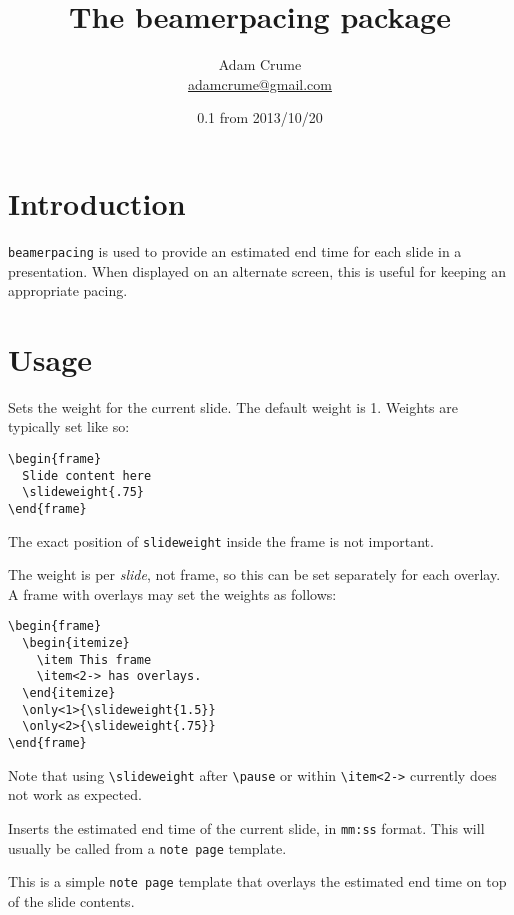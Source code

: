 \documentclass{ltxdoc}
\begin{document}

\title{The \textsf{beamerpacing} package}
\author{Adam Crume \\ \url{adamcrume@gmail.com}}
\date{0.1 from 2013/10/20}

\maketitle

\section{Introduction}

\texttt{beamerpacing} is used to provide an estimated end time for each slide in a presentation.
When displayed on an alternate screen, this is useful for keeping an appropriate pacing.

\section{Usage}

\DescribeMacro{\slideweight}
Sets the weight for the current slide.
The default weight is 1.
Weights are typically set like so:
\begin{verbatim}\begin{frame}
  Slide content here
  \slideweight{.75}
\end{frame}\end{verbatim}
The exact position of \verb|slideweight| inside the frame is not important.

The weight is per \emph{slide}, not frame, so this can be set separately for each overlay.
A frame with overlays may set the weights as follows:
\begin{verbatim}\begin{frame}
  \begin{itemize}
    \item This frame
    \item<2-> has overlays.
  \end{itemize}
  \only<1>{\slideweight{1.5}}
  \only<2>{\slideweight{.75}}
\end{frame}\end{verbatim}
Note that using \verb|\slideweight| after \verb|\pause| or within \verb|\item<2->| currently does not work as expected.

\DescribeMacro{\slidefinishtime}
Inserts the estimated end time of the current slide, in \texttt{mm:ss} format.
This will usually be called from a \texttt{note page} template.

This is a simple \texttt{note page} template that overlays the estimated end time on top of the slide contents.
\end{document}
